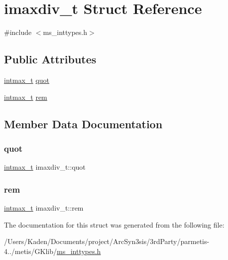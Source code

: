 \hypertarget{a00702}{}\section{imaxdiv\+\_\+t Struct Reference}
\label{a00702}


{\ttfamily \#include $<$ms\+\_\+inttypes.\+h$>$}

\subsection*{Public Attributes}
\begin{DoxyCompactItemize}
\item 
\hyperlink{a00119_a036cd61bb4b30bb510b9538af4cebd1d}{intmax\+\_\+t} \hyperlink{a00702_a9339814cbb7610c72fb7d30c6573b393}{quot}
\item 
\hyperlink{a00119_a036cd61bb4b30bb510b9538af4cebd1d}{intmax\+\_\+t} \hyperlink{a00702_a6c9701ad10bff81edae7ff679cae7850}{rem}
\end{DoxyCompactItemize}


\subsection{Member Data Documentation}
\mbox{\label{a00702_a9339814cbb7610c72fb7d30c6573b393}} 
\subsubsection{\texorpdfstring{quot}{quot}}
{\footnotesize\ttfamily \hyperlink{a00119_a036cd61bb4b30bb510b9538af4cebd1d}{intmax\+\_\+t} imaxdiv\+\_\+t\+::quot}

\mbox{\label{a00702_a6c9701ad10bff81edae7ff679cae7850}} 
\subsubsection{\texorpdfstring{rem}{rem}}
{\footnotesize\ttfamily \hyperlink{a00119_a036cd61bb4b30bb510b9538af4cebd1d}{intmax\+\_\+t} imaxdiv\+\_\+t\+::rem}



The documentation for this struct was generated from the following file\+:\begin{DoxyCompactItemize}
\item 
/\+Users/\+Kaden/\+Documents/project/\+Arc\+Syn3sis/3rd\+Party/parmetis-\/4../metis/\+G\+Klib/\hyperlink{a00113}{ms\+\_\+inttypes.\+h}\end{DoxyCompactItemize}

